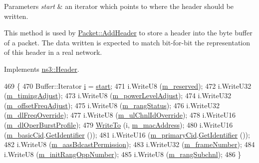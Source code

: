\begin{DoxyParams}{Parameters}
{\em start} & an iterator which points to where the header should be written.\\
\hline
\end{DoxyParams}
This method is used by \hyperlink{classns3_1_1Packet_a465108c595a0bc592095cbcab1832ed8}{Packet\+::\+Add\+Header} to store a header into the byte buffer of a packet. The data written is expected to match bit-\/for-\/bit the representation of this header in a real network. 

Implements \hyperlink{classns3_1_1Header_afb61f1aac69ff8349a6bfe521fab5404}{ns3\+::\+Header}.


\begin{DoxyCode}
469 \{
470   Buffer::Iterator \hyperlink{bernuolliDistribution_8m_a6f6ccfcf58b31cb6412107d9d5281426}{i} = \hyperlink{namespacevisualizer_1_1core_a2a35e5d8a34af358b508dac8635754e0}{start};
471   i.WriteU8 (\hyperlink{classns3_1_1RngRsp_ac2b0e49e6b52d0e0050d2e35ad97e58b}{m\_reserved});
472   i.WriteU32 (\hyperlink{classns3_1_1RngRsp_ad5a122d3cc7cf596f00d0abc711d9062}{m\_timingAdjust});
473   i.WriteU8 (\hyperlink{classns3_1_1RngRsp_a901da94288993e4e4f0cd897e65fb91a}{m\_powerLevelAdjust});
474   i.WriteU32 (\hyperlink{classns3_1_1RngRsp_ac84bb59d1be77321bb81cf7bf29ca11d}{m\_offsetFreqAdjust});
475   i.WriteU8 (\hyperlink{classns3_1_1RngRsp_a47662e9c2019c4b84d6fe0f15405136e}{m\_rangStatus});
476   i.WriteU32 (\hyperlink{classns3_1_1RngRsp_a542bcf2ebe6f5241700fcbeeb3b63fe3}{m\_dlFreqOverride});
477   i.WriteU8 (\hyperlink{classns3_1_1RngRsp_a8f7fff24a6ac3f55bc935b7cc7234090}{m\_ulChnlIdOverride});
478   i.WriteU16 (\hyperlink{classns3_1_1RngRsp_a0e814c8df274e0681dbb33f7b3bb2e1a}{m\_dlOperBurstProfile});
479   \hyperlink{namespacens3_abe3cb0173e87a3f7e2e414358c0a08bf}{WriteTo} (i, \hyperlink{classns3_1_1RngRsp_a0928510e078fa288dd8b0c6a8e728e74}{m\_macAddress});
480   i.WriteU16 (\hyperlink{classns3_1_1RngRsp_acc67a4d993abc670d76279b031ff6103}{m\_basicCid}.\hyperlink{classns3_1_1Cid_a8745a5cf5b7f2e5d142c4fb79072a053}{GetIdentifier} ());
481   i.WriteU16 (\hyperlink{classns3_1_1RngRsp_a1d1e06445b45d170b7f8b5ed67631bcf}{m\_primaryCid}.\hyperlink{classns3_1_1Cid_a8745a5cf5b7f2e5d142c4fb79072a053}{GetIdentifier} ());
482   i.WriteU8 (\hyperlink{classns3_1_1RngRsp_a36340a5031cbd3710c642f34d01ac634}{m\_aasBdcastPermission});
483   i.WriteU32 (\hyperlink{classns3_1_1RngRsp_ade08f14222f2e177310e8afa4ca12871}{m\_frameNumber});
484   i.WriteU8 (\hyperlink{classns3_1_1RngRsp_a782078323f5571e9e3eadb586c9b4533}{m\_initRangOppNumber});
485   i.WriteU8 (\hyperlink{classns3_1_1RngRsp_a808afa245b6051da1b72678a42916ae3}{m\_rangSubchnl});
486 \}
\end{DoxyCode}


